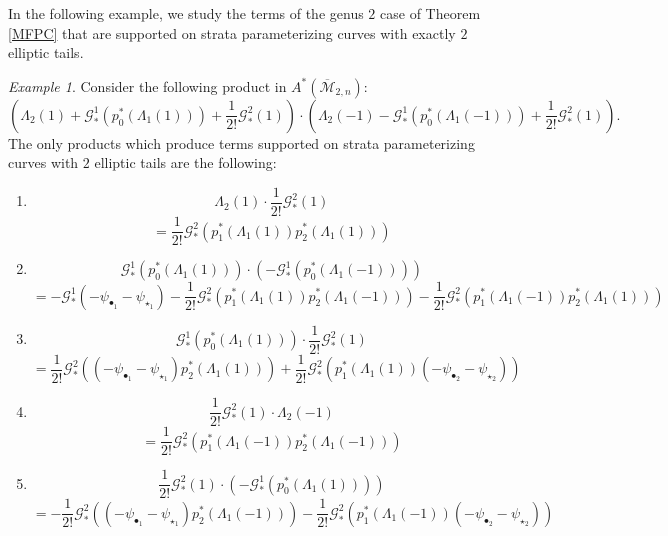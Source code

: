 \documentclass[leqno,12pt]{amsart}
\theoremstyle{remark}
\newtheorem{example}[theorem]{Example}
\numberwithin{equation}{section}
\begin{document}
In the following example, we study the terms of the genus $2$ case of Theorem \ref{MFPC} that are supported on strata parameterizing curves with exactly  $2$ elliptic tails. %

\begin{example}\label{g=2} Consider the following product in $A^*(\overline{\mathcal{M}}_{2, n})$:
    $$
 (\Lambda_2(1) + \mathcal{G}_*^1(p_0^\ast(\Lambda_{1}(1))) + \frac{1}{2!}\mathcal{G}_*^2(1)) \cdot (\Lambda_2(-1) - \mathcal{G}_*^1(p_0^\ast(\Lambda_{1}(-1))) + \frac{1}{2!}\mathcal{G}_*^2(1)).
    $$
The only products which produce terms supported on strata parameterizing curves with $2$ elliptic tails are the following:


\begin{enumerate}
    \item 
    $$
    \Lambda_2(1) \cdot \frac{1}{2!}\mathcal{G}_*^2(1) 
    $$
    $$
    = \frac{1}{2!}\mathcal{G}_*^2(p_1^\ast(\Lambda_{1}(1))p_2^\ast(\Lambda_{1}(1)))
    $$
    
    \item 
    $$
    \mathcal{G}_*^1(p_0^\ast(\Lambda_{1}(1))) \cdot (- \mathcal{G}_*^1(p_0^\ast(\Lambda_{1}(-1))))
    $$
    $$
    = -\mathcal{G}_*^1(-\psi_{\bullet_1}-\psi_{\star_1}) - \frac{1}{2!}\mathcal{G}_*^2(p_1^\ast(\Lambda_{1}(1))p_2^\ast(\Lambda_{1}(-1))) - \frac{1}{2!}\mathcal{G}_*^2(p_1^\ast(\Lambda_{1}(-1))p_2^\ast(\Lambda_{1}(1)))
    $$
    
    \item 
    $$
    \mathcal{G}_*^1(p_0^\ast(\Lambda_{1}(1)))\cdot \frac{1}{2!}\mathcal{G}_*^2(1)
    $$
    $$ = \frac{1}{2!}\mathcal{G}_*^2((-\psi_{\bullet_1}-\psi_{\star_1})p_2^\ast(\Lambda_{1}(1))) + \frac{1}{2!}\mathcal{G}_*^2(p_1^\ast(\Lambda_{1}(1))(-\psi_{\bullet_2}-\psi_{\star_2}))
    $$
    
    \item 
    $$
    \frac{1}{2!}\mathcal{G}_*^2(1) \cdot \Lambda_2(-1)
    $$
    $$
    = \frac{1}{2!}\mathcal{G}_*^2(p_1^\ast(\Lambda_{1}(-1))p_2^\ast(\Lambda_{1}(-1)))
    $$
    
    \item 
    $$
    \frac{1}{2!}\mathcal{G}_*^2(1) \cdot (-\mathcal{G}_*^1(p_0^\ast(\Lambda_{1}(1)))) 
    $$
    $$
    = -\frac{1}{2!}\mathcal{G}_*^2((-\psi_{\bullet_1}-\psi_{\star_1})p_2^\ast(\Lambda_{1}(-1))) - \frac{1}{2!}\mathcal{G}_*^2(p_1^\ast(\Lambda_{1}(-1))(-\psi_{\bullet_2}-\psi_{\star_2}))
    $$
    

\end{enumerate}
\end{example}
\end{document}
